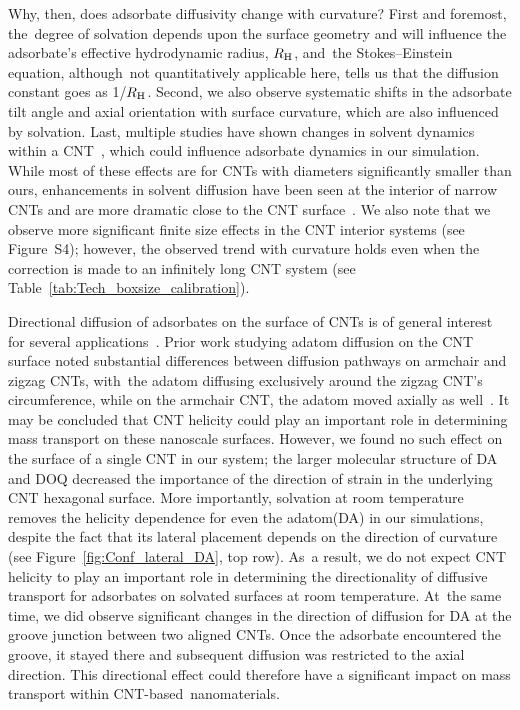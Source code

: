 \documentclass[molecules,article,accept,pdftex,moreauthors]{Definitions/mdpi}
\begin{document}
Why, then, does adsorbate diffusivity change with curvature? First and foremost, the~degree of solvation depends upon the surface geometry and will influence the adsorbate's effective hydrodynamic radius, $R_{\rm H}$, and~the Stokes--Einstein equation, although~not quantitatively applicable here, tells us that the diffusion constant goes as 1/$R_{\rm H}$. Second, we also observe systematic shifts in the adsorbate tilt angle and axial orientation with surface curvature, which are also influenced by solvation. Last, multiple studies have shown changes in solvent dynamics within a CNT~\cite{Striolo2006,Hirunsit2007,Falk2010,Farimani2011,Zheng2012}, which could influence adsorbate dynamics in our simulation. While most of these effects are for CNTs with diameters significantly smaller than ours, enhancements in solvent diffusion have been seen at the interior of narrow CNTs and are more dramatic close to the CNT surface~\cite{Farimani2011, Zheng2012}. We also note that we observe more significant finite size effects in the CNT interior systems (see Figure~S4); however, the observed trend with curvature holds even when the correction is made to an infinitely long CNT system (see Table~\ref{tab:Tech_boxsize_calibration}).

Directional diffusion of adsorbates on the surface of CNTs is of general interest for several applications~\cite{Shu2001, Neek-Amal2010, Lohrasebi2011PRE, Rurali2010, Khodabakhshi2017}. Prior work studying adatom diffusion on the CNT surface noted substantial differences between diffusion pathways on armchair and zigzag CNTs, with~the adatom diffusing exclusively around the zigzag CNT's circumference, while on the armchair CNT, the adatom moved axially as well~\cite{Shu2001}. It may be concluded that CNT helicity could play an important role in determining mass transport on these nanoscale surfaces. However, we found no such effect on the surface of a single CNT in our system; the larger molecular structure of DA and DOQ decreased the importance of the direction of strain in the underlying CNT hexagonal surface. More importantly, solvation at room temperature removes the helicity dependence for even the adatom(DA) in our simulations, despite the fact that its lateral placement depends on the direction of curvature (see Figure~\ref{fig:Conf_lateral_DA}, top row).  As~a result, we do not expect CNT helicity to play an important role in determining the directionality of diffusive transport for adsorbates on solvated surfaces at room temperature. At~the same time, we did observe significant changes in the direction of diffusion for DA at the groove junction between two aligned CNTs. Once the adsorbate encountered the groove, it stayed there and subsequent diffusion was restricted to the axial direction. This directional effect could therefore have a significant impact on mass transport within CNT-based~nanomaterials.
\end{document}
